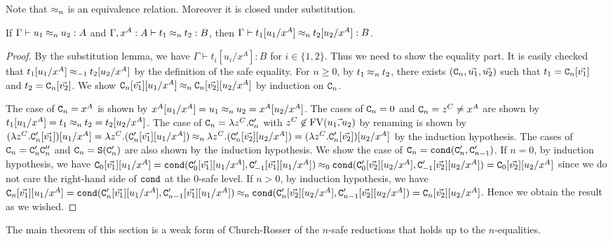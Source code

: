 Note that $\mathbin{\approx_{n}}$ is an equivalence relation. Moreover it is closed under substitution. 
\begin{lemma}\label{lem:nequal_subst}
  If $\Gamma \vdash u_1 \mathbin{\approx_{n}} u_2:A$ and $\Gamma, x^A:A \vdash t_1 \mathbin{\approx_{n}} t_2:B$, then
  $\Gamma \vdash t_1[u_1/x^A] \mathbin{\approx_{n}} t_2[u_2/x^A] :B$. 
\end{lemma}
\begin{proof}
  By the substitution lemma, we have $\Gamma \vdash t_i[u_i/x^A]: B$ for $i\in\{1,2\}$.
  Thus we need to show the equality part. 
  It is easily checked that $t_1[u_1/x^A] \mathbin{\approx_{-1}} t_2[u_2/x^A]$ by the definition of the safe equality.
  For $n\ge 0$, by $t_1\mathbin{\approx_{n}} t_2$, there exists $({\tt C}_{n},\vec{u_1},\vec{u_2})$ such that
  $t_1 = {\tt C}_{n}[\vec{v_1}]$ and $t_2 = {\tt C}_{n}[\vec{v_2}]$.
  We show ${\tt C}_{n}[\vec{v_1}][u_1/x^A] \mathbin{\approx_{n}} {\tt C}_{n}[\vec{v_2}][u_2/x^A]$ by induction on ${\tt C}_{n}$. 

  The case of ${\tt C}_{n}=x^A$ is shown by $x^A[u_1/x^A] = u_1 \mathbin{\approx_{n}} u_2 = x^A[u_2/x^A]$.
  The cases of ${\tt C}_{n}=0$ and ${\tt C}_{n}=z^C \neq x^A$
  are shown by $t_1[u_1/x^A] = t_1 \mathbin{\approx_{n}} t_2 = t_2[u_2/x^A]$.
  The case of ${\tt C}_{n}=\lambda z^C.{\tt C}_{n}'$ with $z^C\not\in{{\rm FV}}(\vec{u_1,u_2})$ by renaming
  is shown by
  $(\lambda z^C.{\tt C}_{n}'[\vec{v_1}])[u_1/x^A] = \lambda z^C.({\tt C}_{n}'[\vec{v_1}][u_1/x^A]) \mathbin{\approx_{n}} \lambda z^C.({\tt C}_{n}'[\vec{v_2}][u_2/x^A]) = (\lambda z^C.{\tt C}_{n}'[\vec{v_2}])[u_2/x^A]$ by the induction hypothesis.
  The cases of ${\tt C}_{n}={\tt C}_{n}'{\tt C}_{n}''$ and ${\tt C}_{n}={\tt S}({\tt C}_{n}')$
  are also shown by the induction hypothesis.
  We show the case of ${\tt C}_{n}={\tt cond}({\tt C}_{n}',{\tt C}_{n-1}')$.
  If $n=0$, by induction hypothesis, we have ${\tt C}_{0}[\vec{v_1}][u_1/x^A] = {\tt cond}({\tt C}_{0}'[\vec{v_1}][u_1/x^A],{\tt C}_{-1}'[\vec{v_1}][u_1/x^A]) \mathbin{\approx_{0}} {\tt cond}({\tt C}_{0}'[\vec{v_2}][u_2/x^A],{\tt C}_{-1}'[\vec{v_2}][u_2/x^A]) = {\tt C}_{0}[\vec{v_2}][u_2/x^A]$ since we do not care the right-hand side of ${\tt cond}$ at the $0$-safe level. 
  If $n>0$, by induction hypothesis, we have ${\tt C}_{n}[\vec{v_1}][u_1/x^A] = {\tt cond}({\tt C}_{n}'[\vec{v_1}][u_1/x^A],{\tt C}_{n-1}'[\vec{v_1}][u_1/x^A]) \mathbin{\approx_{n}} {\tt cond}({\tt C}_{n}'[\vec{v_2}][u_2/x^A],{\tt C}_{n-1}'[\vec{v_2}][u_2/x^A]) = {\tt C}_{n}[\vec{v_2}][u_2/x^A]$.
  Hence we obtain the result as we wished. 
\end{proof}


The main theorem of this section is a weak form of Church-Rosser
of the $n$-safe reductions that holds up to the $n$-equalities. 

